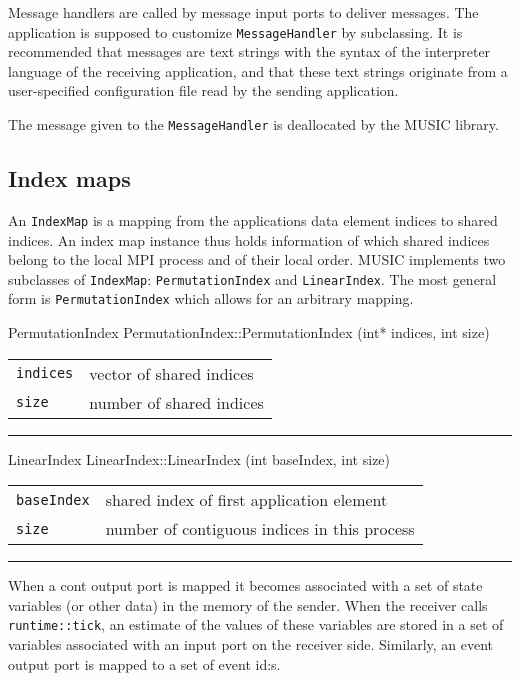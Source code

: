 \documentclass[a4paper,twoside]{report}
\makeatletter
\newenvironment{parameters}%
{\begin{tabular}{@{\hspace{2em}}lp{0.6\textwidth}}}%
{\end{tabular}\par\vspace{1mm}\par\hrule\par\vspace{5mm}}
\makeatother
\begin{document}
Message handlers are called by message input ports to deliver
messages.  The application is supposed to customize
\lstinline|MessageHandler| by subclassing.  It is recommended that
messages are text strings with the syntax of the interpreter language
of the receiving application, and that these text strings originate
from a user-specified configuration file read by the sending
application.

The message given to the \lstinline|MessageHandler| is deallocated by
the MUSIC library.


\subsection{Index maps}

An \lstinline|IndexMap| is a mapping from the applications data
element indices to shared indices.  An index map instance thus
holds information of which shared indices belong to the local MPI
process and of their local order.  MUSIC implements two subclasses of
\lstinline|IndexMap|: \lstinline|PermutationIndex| and
\lstinline|LinearIndex|.  The most general form is
\lstinline|PermutationIndex| which allows for an arbitrary mapping.

\begin{head}{PermutationIndex}
  PermutationIndex::PermutationIndex (int* indices,
                                      int size)
\end{head}
\begin{parameters}
  \lstinline|indices| & vector of shared indices \\
  \lstinline|size| & number of shared indices \\
\end{parameters}

\begin{head}{LinearIndex}
  LinearIndex::LinearIndex (int baseIndex, int size)
\end{head}
\begin{parameters}
  \lstinline|baseIndex| & shared index of first application element \\
  \lstinline|size| & number of contiguous indices in this process \\
\end{parameters}

When a cont output port is mapped it becomes associated with a set of
state variables (or other data) in the memory of the sender.  When the
receiver calls \lstinline|runtime::tick|, an estimate of the values
of these variables are stored in a set of variables associated with an
input port on the receiver side.  Similarly, an event output port is
mapped to a set of event id:s.
\end{document}
